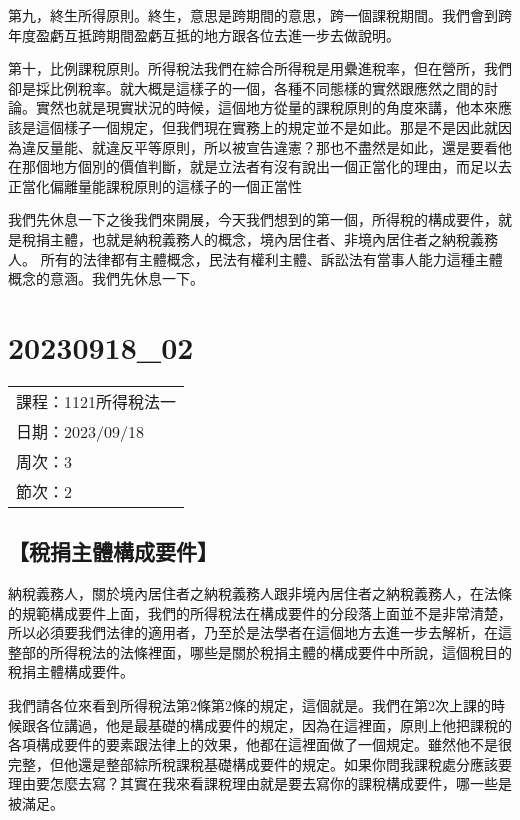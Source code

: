 \documentclass[]{ctexbook}
\begin{document}
第九，終生所得原則。終生，意思是跨期間的意思，跨一個課稅期間。我們會到跨年度盈虧互抵跨期間盈虧互抵的地方跟各位去進一步去做說明。

第十，比例課稅原則。所得稅法我們在綜合所得稅是用纍進稅率，但在營所，我們卻是採比例稅率。就大概是這樣子的一個，各種不同態樣的實然跟應然之間的討論。實然也就是現實狀況的時候，這個地方從量的課稅原則的角度來講，他本來應該是這個樣子一個規定，但我們現在實務上的規定並不是如此。那是不是因此就因為違反量能、就違反平等原則，所以被宣告違憲？那也不盡然是如此，還是要看他在那個地方個別的價值判斷，就是立法者有沒有說出一個正當化的理由，而足以去正當化偏離量能課稅原則的這樣子的一個正當性

我們先休息一下之後我們來開展，今天我們想到的第一個，所得稅的構成要件，就是稅捐主體，也就是納稅義務人的概念，境內居住者、非境內居住者之納稅義務人。
所有的法律都有主體概念，民法有權利主體、訴訟法有當事人能力這種主體概念的意涵。我們先休息一下。

\hypertarget{section-6}{%
\chapter{20230918\_02}\label{section-6}}

\begin{longtable}[]{@{}l@{}}
\toprule()
\endhead
課程：1121所得稅法一 \\
日期：2023/09/18 \\
周次：3 \\
節次：2 \\
\bottomrule()
\end{longtable}

\hypertarget{ux7a05ux6350ux4e3bux9ad4ux69cbux6210ux8981ux4ef6}{%
\section{【稅捐主體構成要件】}\label{ux7a05ux6350ux4e3bux9ad4ux69cbux6210ux8981ux4ef6}}

納稅義務人，關於境內居住者之納稅義務人跟非境內居住者之納稅義務人，在法條的規範構成要件上面，我們的所得稅法在構成要件的分段落上面並不是非常清楚，所以必須要我們法律的適用者，乃至於是法學者在這個地方去進一步去解析，在這整部的所得稅法的法條裡面，哪些是關於稅捐主體的構成要件中所說，這個稅目的稅捐主體構成要件。

我們請各位來看到所得稅法第2條第2條的規定，這個就是。我們在第2次上課的時候跟各位講過，他是最基礎的構成要件的規定，因為在這裡面，原則上他把課稅的各項構成要件的要素跟法律上的效果，他都在這裡面做了一個規定。雖然他不是很完整，但他還是整部綜所稅課稅基礎構成要件的規定。如果你問我課稅處分應該要理由要怎麼去寫？其實在我來看課稅理由就是要去寫你的課稅構成要件，哪一些是被滿足。
\end{document}

